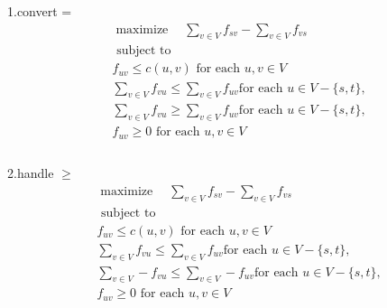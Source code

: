 \documentclass[a4paper, justified]{tufte-handout}
\begin{document}
\begin{problem}[TC 29.4-3]
\end{problem}

\begin{solution}
  1.convert =
  $$
    \begin{aligned}
       & \operatorname{maximize} \quad \sum_{v \in V} f_{sv} - \sum_{v \in V} f_{vs}          \\
       & \text { subject to }                                                                 \\
       & f_{uv} \leq c(u,v) \text { for each  }u, v\in V                                      \\
       & \sum_{v \in V} f_{vu} \leq \sum_{v \in V} f_{uv}   \text {for each  }u\in V-\{s,t\}, \\
       & \sum_{v \in V} f_{vu} \geq \sum_{v \in V} f_{uv}   \text {for each  }u\in V-\{s,t\}, \\
       & f_{uv} \geq 0   \text { for each  }u, v\in V                                         \\
    \end{aligned}
  $$\\
  2.handle $\geq$\\
  $$
    \begin{aligned}
       & \operatorname{maximize} \quad \sum_{v \in V} f_{sv} - \sum_{v \in V} f_{vs}            \\
       & \text { subject to }                                                                   \\
       & f_{uv} \leq c(u,v) \text { for each  }u, v\in V                                        \\
       & \sum_{v \in V} f_{vu} \leq \sum_{v \in V} f_{uv}   \text {for each  }u\in V-\{s,t\},   \\
       & \sum_{v \in V} -f_{vu} \leq \sum_{v \in V} -f_{uv}   \text {for each  }u\in V-\{s,t\}, \\
       & f_{uv} \geq 0   \text { for each  }u, v\in V                                           \\
    \end{aligned}
  $$
\end{solution}

\begin{problem}[TC Problem 29-1]
\end{problem}
\end{document}
